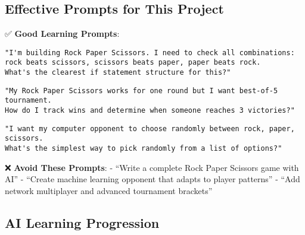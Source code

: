 \documentclass[
  letterpaper,
  DIV=11,
  numbers=noendperiod,
  oneside]{scrreprt}
\begin{document}
\subsection{Effective Prompts for This
Project}\label{effective-prompts-for-this-project-3}

✅ \textbf{Good Learning Prompts}:

\begin{verbatim}
"I'm building Rock Paper Scissors. I need to check all combinations: 
rock beats scissors, scissors beats paper, paper beats rock. 
What's the clearest if statement structure for this?"
\end{verbatim}

\begin{verbatim}
"My Rock Paper Scissors works for one round but I want best-of-5 tournament. 
How do I track wins and determine when someone reaches 3 victories?"
\end{verbatim}

\begin{verbatim}
"I want my computer opponent to choose randomly between rock, paper, scissors. 
What's the simplest way to pick randomly from a list of options?"
\end{verbatim}

❌ \textbf{Avoid These Prompts}: - ``Write a complete Rock Paper
Scissors game with AI'' - ``Create machine learning opponent that adapts
to player patterns'' - ``Add network multiplayer and advanced tournament
brackets''

\subsection{AI Learning Progression}\label{ai-learning-progression-3}
\end{document}
